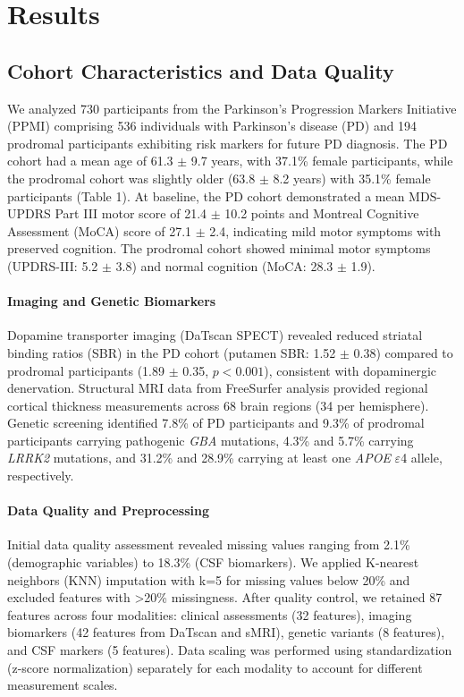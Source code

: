 \section{Results}

\subsection{Cohort Characteristics and Data Quality}

We analyzed 730 participants from the Parkinson's Progression Markers Initiative (PPMI) comprising 536 individuals with Parkinson's disease (PD) and 194 prodromal participants exhibiting risk markers for future PD diagnosis. The PD cohort had a mean age of 61.3 $\pm$ 9.7 years, with 37.1\% female participants, while the prodromal cohort was slightly older (63.8 $\pm$ 8.2 years) with 35.1\% female participants (Table 1). At baseline, the PD cohort demonstrated a mean MDS-UPDRS Part III motor score of 21.4 $\pm$ 10.2 points and Montreal Cognitive Assessment (MoCA) score of 27.1 $\pm$ 2.4, indicating mild motor symptoms with preserved cognition. The prodromal cohort showed minimal motor symptoms (UPDRS-III: 5.2 $\pm$ 3.8) and normal cognition (MoCA: 28.3 $\pm$ 1.9).

\paragraph{Imaging and Genetic Biomarkers}
Dopamine transporter imaging (DaTscan SPECT) revealed reduced striatal binding ratios (SBR) in the PD cohort (putamen SBR: 1.52 $\pm$ 0.38) compared to prodromal participants (1.89 $\pm$ 0.35, $p < 0.001$), consistent with dopaminergic denervation. Structural MRI data from FreeSurfer analysis provided regional cortical thickness measurements across 68 brain regions (34 per hemisphere). Genetic screening identified 7.8\% of PD participants and 9.3\% of prodromal participants carrying pathogenic \textit{GBA} mutations, 4.3\% and 5.7\% carrying \textit{LRRK2} mutations, and 31.2\% and 28.9\% carrying at least one \textit{APOE} $\varepsilon$4 allele, respectively.

\paragraph{Data Quality and Preprocessing}
Initial data quality assessment revealed missing values ranging from 2.1\% (demographic variables) to 18.3\% (CSF biomarkers). We applied K-nearest neighbors (KNN) imputation with k=5 for missing values below 20\% and excluded features with >20\% missingness. After quality control, we retained 87 features across four modalities: clinical assessments (32 features), imaging biomarkers (42 features from DaTscan and sMRI), genetic variants (8 features), and CSF markers (5 features). Data scaling was performed using standardization (z-score normalization) separately for each modality to account for different measurement scales.


